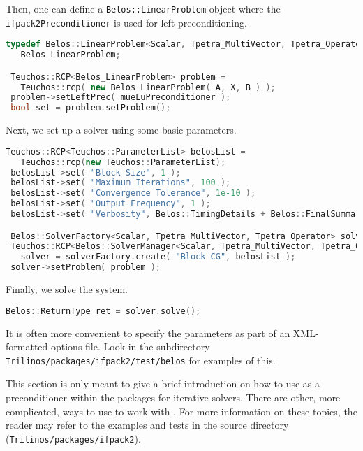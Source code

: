 Then, one can define a \texttt{Belos::LinearProblem} object where the
\texttt{ifpack2Preconditioner} is used for left preconditioning.
\begin{lstlisting}[language=C++]
 typedef Belos::LinearProblem<Scalar, Tpetra_MultiVector, Tpetra_Operator>
   Belos_LinearProblem;

 Teuchos::RCP<Belos_LinearProblem> problem =
   Teuchos::rcp( new Belos_LinearProblem( A, X, B ) );
 problem->setLeftPrec( mueLuPreconditioner );
 bool set = problem.setProblem();
\end{lstlisting}

Next, we set up a \belos{} solver using some basic parameters.
\begin{lstlisting}[language=C++]
 Teuchos::RCP<Teuchos::ParameterList> belosList =
   Teuchos::rcp(new Teuchos::ParameterList);
 belosList->set( "Block Size", 1 );
 belosList->set( "Maximum Iterations", 100 );
 belosList->set( "Convergence Tolerance", 1e-10 );
 belosList->set( "Output Frequency", 1 );
 belosList->set( "Verbosity", Belos::TimingDetails + Belos::FinalSummary );

 Belos::SolverFactory<Scalar, Tpetra_MultiVector, Tpetra_Operator> solverFactory;
 Teuchos::RCP<Belos::SolverManager<Scalar, Tpetra_MultiVector, Tpetra_Operator> >
   solver = solverFactory.create( "Block CG", belosList );
 solver->setProblem( problem );
\end{lstlisting}

Finally, we solve the system.
\begin{lstlisting}[language=C++]
 Belos::ReturnType ret = solver.solve();
\end{lstlisting}

It is often more convenient to specify the parameters as part of an XML-formatted options file.
Look in the subdirectory {\tt Trilinos/packages/ifpack2/test/belos} for examples of this.

This section is only meant to give a brief introduction on how to use
\ifpacktwo{} as a preconditioner within the \trilinos{} packages for iterative
solvers. There are other, more complicated, ways to use to work with
\ifpacktwo{}. For more information on these topics, the reader may refer to the
examples and tests in the \ifpacktwo{} source directory
(\texttt{Trilinos/packages/ifpack2}).
